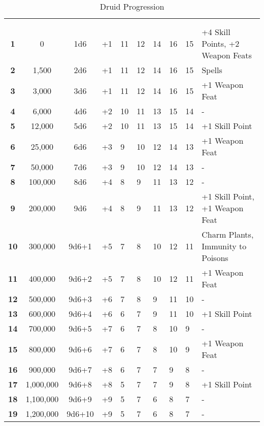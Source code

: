 \begin {table}[H]
  \caption{Druid Progression}
	\begin{tabularx}{\columnwidth}{>{\bfseries}cccM{.31in}M{.51in}M{.25in}M{.43in}M{.32in}M{.45in}Y}
    \thead{}&\thead{}&\thead{}&\thead{}&\thead{}&\setcounter{rownum}{0}\\
     &  &  &  &  &  &  &  &  & \\
		1 & 0 & 1d6 & +1 & 11 & 12 & 14 & 16 & 15 & +4 Skill Points, +2 Weapon Feats\\
		2 & 1,500 & 2d6 & +1 & 11 & 12 & 14 & 16 & 15 & Spells\\
		3 & 3,000 & 3d6 & +1 & 11 & 12 & 14 & 16 & 15 & +1 Weapon Feat\\
		4 & 6,000 & 4d6 & +2 & 10 & 11 & 13 & 15 & 14 & -\\
		5 & 12,000 & 5d6 & +2 & 10 & 11 & 13 & 15 & 14 & +1 Skill Point\\
		6 & 25,000 & 6d6 & +3 & 9 & 10 & 12 & 14 & 13 & +1 Weapon Feat\\
		7 & 50,000 & 7d6 & +3 & 9 & 10 & 12 & 14 & 13 & -\\
		8 & 100,000 & 8d6 & +4 & 8 & 9 & 11 & 13 & 12 & -\\
		9 & 200,000 & 9d6 & +4 & 8 & 9 & 11 & 13 & 12 & +1 Skill Point, +1 Weapon Feat\\
		10 & 300,000 & 9d6+1 & +5 & 7 & 8 & 10 & 12 & 11 & Charm Plants, Immunity to Poisons\\
		11 & 400,000 & 9d6+2 & +5 & 7 & 8 & 10 & 12 & 11 & +1 Weapon Feat\\
		12 & 500,000 & 9d6+3 & +6 & 7 & 8 & 9 & 11 & 10 & -\\
		13 & 600,000 & 9d6+4 & +6 & 6 & 7 & 9 & 11 & 10 & +1 Skill Point\\
		14 & 700,000 & 9d6+5 & +7 & 6 & 7 & 8 & 10 & 9 & -\\
		15 & 800,000 & 9d6+6 & +7 & 6 & 7 & 8 & 10 & 9 & +1 Weapon Feat\\
		16 & 900,000 & 9d6+7 & +8 & 6 & 7 & 7 & 9 & 8 & -\\
		17 & 1,000,000 & 9d6+8 & +8 & 5 & 7 & 7 & 9 & 8 & +1 Skill Point\\
		18 & 1,100,000 & 9d6+9 & +9 & 5 & 7 & 6 & 8 & 7 & -\\
		19 & 1,200,000 & 9d6+10 & +9 & 5 & 7 & 6 & 8 & 7 & -\\

\end{tabularx}
\end{table}
